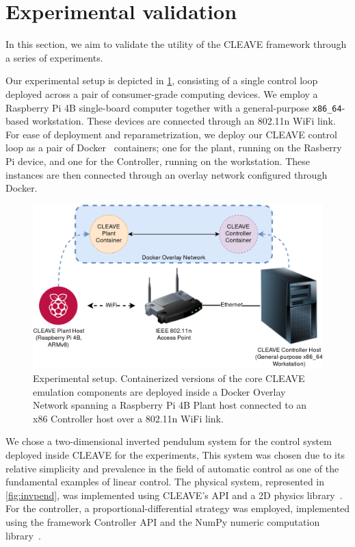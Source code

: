 \section{Experimental validation}\label{sec:experiments}


In this section, we aim to validate the utility of the CLEAVE framework through a series of experiments.


Our experimental setup is depicted in \cref{fig:cleave:expsetup}, consisting of a single control loop deployed across a pair of consumer-grade computing devices.
We employ a Raspberry Pi 4B single-board computer together with a general-purpose \verb|x86_64|-based workstation.
These devices are connected through an 802.11n WiFi link.
For ease of deployment and reparametrization, we deploy our CLEAVE control loop as a pair of Docker~\cite{merkel2014docker} containers; one for the plant, running on the Rasberry Pi device, and one for the Controller, running on the workstation. 
These instances are then connected through an overlay network configured through Docker.

\begin{figure}
    \centering
    \includegraphics[width=.95\columnwidth]{images/CLEAVE_experiment_setup}
    \caption{Experimental setup. Containerized versions of the core CLEAVE emulation components are deployed inside a Docker Overlay Network spanning a Raspberry Pi 4B Plant host connected to an x86 Controller host over a 802.11n WiFi link.}\label{fig:cleave:expsetup}
\end{figure}

We chose a two-dimensional inverted pendulum system for the control system deployed inside CLEAVE for the experiments, 
This system was chosen due to its relative simplicity and prevalence in the field of automatic control as one of the fundamental examples of linear control.
The physical system, represented in \cref{fig:invpend}, was implemented using CLEAVE's API and a 2D physics library~\autocite{chipmunk2d,pymunk}.
For the controller, a proportional-differential strategy was employed, implemented using the framework Controller API and the NumPy numeric computation library~\autocite{harris2020array}.

